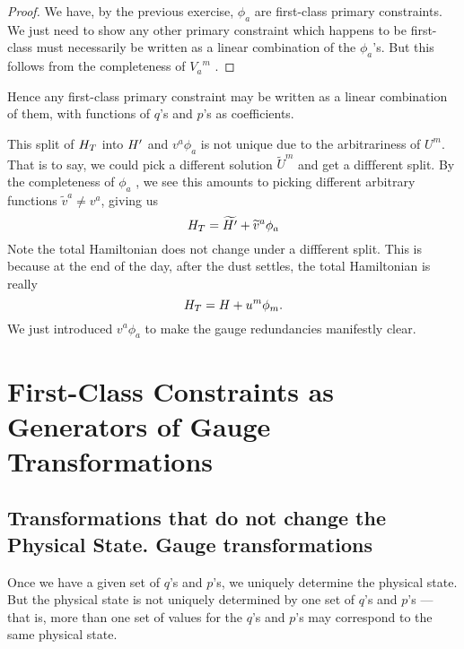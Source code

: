 \begin{proof}
We have, by the previous exercise, $\phi_{a}$ are first-class primary
constraints. We just need to show any other primary constraint which
happens to be first-class must necessarily be written as a linear
combination of the $\phi_{a}$'s. But this follows from the completeness
of ${V_{a}}^{m}$ .
\end{proof}

Hence any first-class primary constraint may be written as a linear
combination of them, with functions of $q$'s and $p$'s as coefficients.

This split of $H_{T}$ into $H'$ and
$v^{a}\phi_{a}$ is not unique due to the arbitrariness of $U^{m}$. That
is to say, we could pick a different solution $\widetilde{U}^{m}$ and
get a diffferent split. By the completeness of $\phi_{a}$
,
we see this amounts to picking different arbitrary functions
$\widetilde{v}^{a}\neq v^{a}$, giving us 
\begin{equation}
H_{T} = \widetilde{H'} + \widetilde{v}^{a}\phi_{a}
\end{equation}
Note the total Hamiltonian does not change under a diffferent
split. This is because at the end of the day, after the dust settles,
the total Hamiltonian is really
\begin{equation}
H_{T} = H + u^{m}\phi_{m}.
\end{equation}
We just introduced $v^{a}\phi_{a}$ to make the gauge redundancies
manifestly clear.

\section{First-Class Constraints as Generators of Gauge Transformations}
\subsection{Transformations that do not change the Physical State. Gauge transformations}

Once we have a given set of $q$'s and $p$'s, we uniquely determine the
physical state. But the physical state is not uniquely determined by one
set of $q$'s and $p$'s --- that is, more than one set of values for the
$q$'s and $p$'s may correspond to the same physical state.

